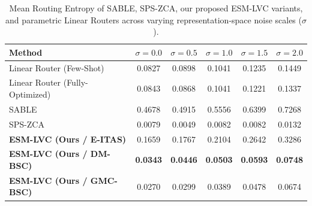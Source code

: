 \begin{table}[t]
\caption{Mean Routing Entropy of SABLE, SPS-ZCA, our proposed ESM-LVC variants, and parametric Linear Routers across varying representation-space noise scales ($\sigma$).}
\label{tab:physical_entropy}
\vskip 0.15in
\begin{center}
\begin{small}
\begin{sc}
\begin{tabular}{lccccc}
\toprule
Method & $\sigma = 0.0$ & $\sigma = 0.5$ & $\sigma = 1.0$ & $\sigma = 1.5$ & $\sigma = 2.0$ \\
\midrule
Linear Router (Few-Shot) & 0.0827 & 0.0898 & 0.1041 & 0.1235 & 0.1449 \\
Linear Router (Fully-Optimized) & 0.0843 & 0.0868 & 0.1041 & 0.1221 & 0.1337 \\
SABLE & 0.4678 & 0.4915 & 0.5556 & 0.6399 & 0.7268 \\
SPS-ZCA & 0.0079 & 0.0049 & 0.0082 & 0.0082 & 0.0132 \\
\textbf{ESM-LVC (Ours / E-ITAS)} & 0.1659 & 0.1767 & 0.2104 & 0.2642 & 0.3286 \\
\textbf{ESM-LVC (Ours / DM-BSC)} & \textbf{0.0343} & \textbf{0.0446} & \textbf{0.0503} & \textbf{0.0593} & \textbf{0.0748} \\
\textbf{ESM-LVC (Ours / GMC-BSC)} & 0.0270 & 0.0299 & 0.0389 & 0.0478 & 0.0674 \\
\bottomrule
\end{tabular}
\end{sc}
\end{small}
\end{center}
\vskip -0.1in
\end{table}

